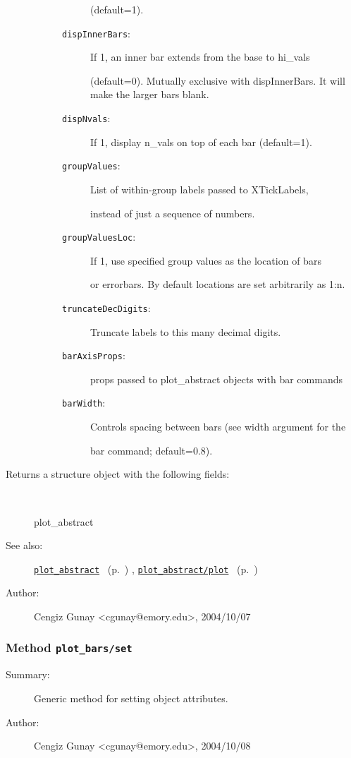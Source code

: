 \begin{description}
\begin{description}
\begin{description}
(default=1).
\item[\texttt{dispInnerBars}:]
 If 1, an inner bar extends from the base to hi\_vals

(default=0). Mutually exclusive with
dispInnerBars. It will make the larger bars blank.
\item[\texttt{dispNvals}:]
 If 1, display n\_vals on top of each bar (default=1).
\item[\texttt{groupValues}:]
 List of within-group labels passed to XTickLabels,

instead of just a sequence of numbers.
\item[\texttt{groupValuesLoc}:]
 If 1, use specified group values as the location of bars

or errorbars. By default locations are set arbitrarily as 1:n.
\item[\texttt{truncateDecDigits}:]
 Truncate labels to this many decimal digits.
\item[\texttt{barAxisProps}:]
 props passed to plot\_abstract objects with bar commands
\item[\texttt{barWidth}:]
 Controls spacing between bars (see width argument for the

bar command; default=0.8).
\end{description}%
\end{description}%
%
\item[Returns a structure object with the following fields:
]~

   plot\_abstract
%
%
\item[See also:]%
\hyperlink{ref_plot_abstract}{\texttt{plot\_abstract}}%
\ (p.~\pageref{ref_plot_abstract})%
%
, \hyperlink{ref_plot_abstract__plot}{\texttt{plot\_abstract/plot}}%
\ (p.~\pageref{ref_plot_abstract__plot})%
%
%
\item[Author:]%
Cengiz Gunay <cgunay@emory.edu>, 2004/10/07
%
\end{description}
\methodline%
\subsubsection[Method \texttt{set}]{Method \texttt{plot\_bars/set}}%
%
\label{ref_plot_bars__set}%
\hypertarget{ref_plot_bars__set}{}%
\begin{description}
\item[Summary:]Generic method for setting object attributes.
%
%
%
%
%
%
%
\item[Author:]%
Cengiz Gunay <cgunay@emory.edu>, 2004/10/08
%
\end{description}
\methodline%
